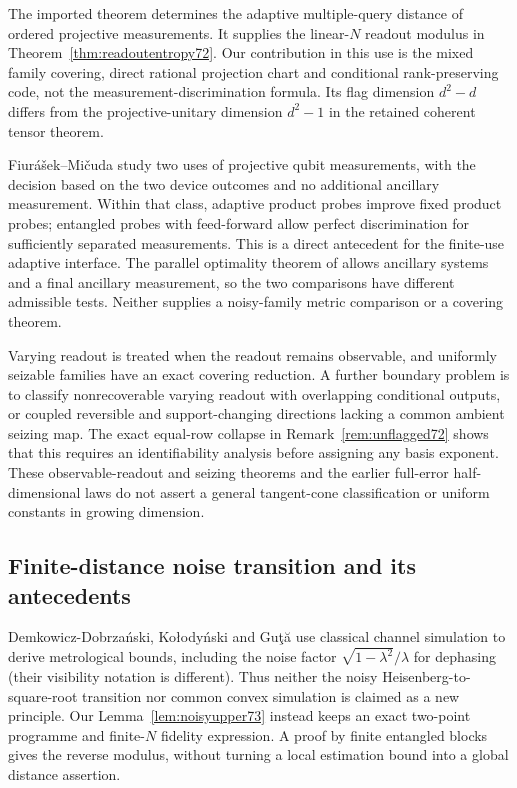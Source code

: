 The imported theorem \cite[Corollary~1 and Theorem~2]{PPKKO72}
determines the adaptive multiple-query distance of ordered projective
measurements. It supplies the linear-$N$ readout modulus in
Theorem~\ref{thm:readoutentropy72}. Our contribution in this use is the
mixed family covering, direct rational projection chart and conditional
rank-preserving code, not the measurement-discrimination formula.
Its flag dimension $d^2-d$ differs from the projective-unitary dimension
$d^2-1$ in the retained coherent tensor theorem.

Fiur\'a\v sek--Mi\v cuda \cite[Sections~I, III and IV]{FM75} study
two uses of projective qubit measurements, with the decision based on
the two device outcomes and no additional ancillary measurement.
Within that class, adaptive product probes improve fixed product
probes; entangled probes with feed-forward allow perfect
discrimination for sufficiently separated measurements. This is a
direct antecedent for the finite-use adaptive interface. The parallel
optimality theorem of \cite[Theorem~2]{PPKKO72} allows ancillary
systems and a final ancillary measurement, so the two comparisons
have different admissible tests. Neither supplies a noisy-family
metric comparison or a covering theorem.

Varying readout is treated when the readout remains observable,
and uniformly seizable families have an exact covering reduction.
A further boundary problem is to classify nonrecoverable varying
readout with overlapping conditional outputs, or coupled reversible
and support-changing directions lacking a common ambient seizing map.
The exact equal-row collapse in Remark~\ref{rem:unflagged72} shows
that this requires an identifiability analysis before assigning any
basis exponent. These observable-readout and seizing theorems and the earlier full-error
half-dimensional laws do not assert a general tangent-cone classification
or uniform constants in growing dimension.


\subsection{Finite-distance noise transition and its antecedents}
Demkowicz-Dobrza\'nski, Ko\l ody\'nski and Gu\c t\u a
\cite[Eq.~(4) and the dephasing example]{DKG67} use classical channel
simulation to derive metrological bounds, including the noise factor
$\sqrt{1-\lambda^2}/\lambda$ for dephasing (their visibility notation
is different). Thus neither the noisy Heisenberg-to-square-root
transition nor common convex simulation is claimed as a new principle.
Our Lemma~\ref{lem:noisyupper73} instead keeps an exact two-point
programme and finite-$N$ fidelity expression. A proof by finite
entangled blocks gives the reverse modulus, without turning a local
estimation bound into a global distance assertion.

